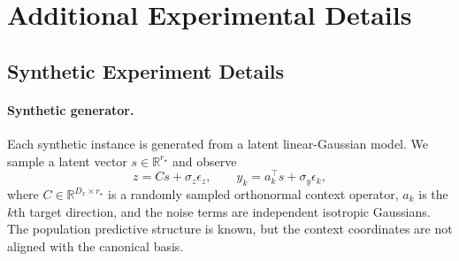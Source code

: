\section{Additional Experimental Details}
\label{app:experimental-details}


\subsection{Synthetic Experiment Details}
\label{app:synthetic-experimental-details}

\paragraph{Synthetic generator.}
Each synthetic instance is generated from a latent linear-Gaussian model. We
sample a latent vector $s \in \mathbb{R}^{r_\star}$ and observe
\[
    z = C s + \sigma_z \epsilon_z,
    \qquad
    y_k = a_k^\top s + \sigma_y \epsilon_k,
\]
where $C \in \mathbb{R}^{D_x \times r_\star}$ is a randomly sampled
orthonormal context operator, $a_k$ is the $k$th target direction, and the noise
terms are independent isotropic Gaussians. The population predictive structure
is known, but the context coordinates are not aligned with the canonical basis.


